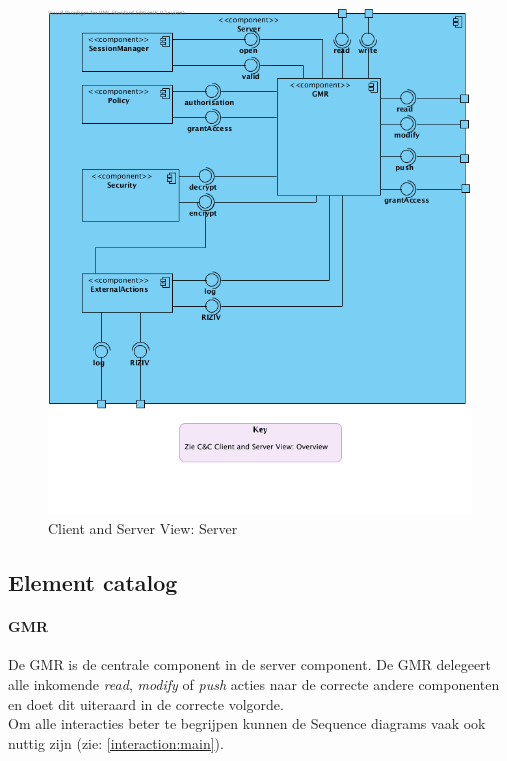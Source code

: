 \documentclass[a4paper,10pt]{article}
\begin{document}
\begin{figure}[!h]
  \includegraphics[scale=0.60]{../images/ClientServer_Server.png}
  \caption{Client and Server View: Server}
\end{figure}


\subsection{Element catalog}

\paragraph{GMR}
De GMR is de centrale component in de server component.  De GMR delegeert alle inkomende \textit{read}, \textit{modify} of \textit{push} acties naar de correcte andere componenten en doet dit uiteraard in de correcte volgorde.\\
Om alle interacties beter te begrijpen kunnen de Sequence diagrams vaak ook nuttig zijn (zie: \ref{interaction:main}).
\end{document}
